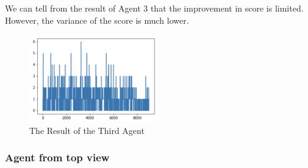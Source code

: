 \documentclass{article}
\begin{document}
We can tell from the result of Agent 3 that the improvement in score is limited. However, the variance of the score is much lower. 

\begin{figure}[H]
\caption{The Result of the Third Agent}
\centering
\includegraphics[width=0.5\textwidth]{ThirdAgent.png}
\end{figure}

\subsubsection{Agent from top view}


\end{document}
